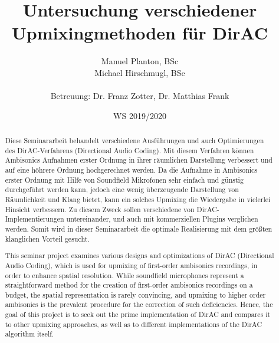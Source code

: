 \documentclass[12pt, a4paper]{article}
\begin{document}

\title{Untersuchung verschiedener Upmixingmethoden für DirAC}

\author{Manuel Planton, BSc \\ Michael Hirschmugl, BSc\\\\\small{Betreuung: Dr. Franz Zotter, Dr. Matthias Frank}}



\date{WS 2019/2020}

\maketitle
\newpage
\pagestyle{empty}
\hspace{1cm}\vspace{3cm}

\hspace{1cm}\vspace{1cm}

\begin{abstract}
   Diese Seminararbeit behandelt verschiedene Ausführungen und auch Optimierungen des DirAC-Verfahrens (Directional Audio Coding). Mit diesem Verfahren können Ambisonics Aufnahmen erster Ordnung in ihrer räumlichen Darstellung verbessert und auf eine höhrere Ordnung hochgerechnet werden.
   Da die Aufnahme in Ambisonics erster Ordnung mit Hilfe von Soundfield Mikrofonen sehr einfach und günstig durchgeführt werden kann, jedoch eine wenig überzeugende Darstellung von Räumlichkeit und Klang bietet, kann ein solches Upmixing die Wiedergabe in vielerlei Hinsicht verbessern.
   Zu diesem Zweck sollen verschiedene von DirAC-Implementierungen untereinander, und auch mit kommerziellen Plugins verglichen werden. Somit wird in dieser Seminararbeit die optimale Realisierung mit dem größten klanglichen Vorteil gesucht.
\end{abstract}
\begin{abstract}
   This seminar project examines various designs and optimizations of DirAC (Directional Audio Coding), which is used for upmixing of first-order ambisonics recordings, in order to enhance spatial resolution.
   While soundfield microphones represent a straightforward method for the creation of first-order ambisonics recordings on a budget, the spatial representation is rarely convincing, and upmixing to higher order ambisonics is the prevalent procedure for the correction of such deficiencies.
   Hence, the goal of this project is to seek out the prime implementation of DirAC and compares it to other upmixing approaches, as well as to different implementations of the DirAC algorithm itself.
\end{abstract}
\newpage
\pagestyle{myheadings}
\hspace{1cm}\vspace{2cm}
\end{document}

